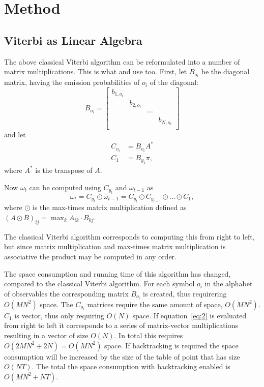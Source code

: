 \chapter{Method}
\label{cha:method}

\section{Viterbi as Linear Algebra}
\label{sec:algorithm-as-linear}

The above classical Viterbi algorithm can be reformulated into a number of
matrix multiplications. This is what \citet{sand2013ziphmmlib} and
\citet{lifshits2009speeding} use too. First, let $B_{o_i}$ be the diagonal
matrix, having the emission probabilities of $o_i$ of the diagonal:
\begin{equation*}
  B_{o_i} =
  \begin{bmatrix}
    b_{1, o_i} &            &        &            \\
               & b_{2, o_i} &        &            \\
               &            & \cdots &            \\
               &            &        & b_{N, o_i} \\
  \end{bmatrix}
\end{equation*}
and let
\begin{align*}
  C_{o_i} &= B_{o_i} A^* \\
  C_1 &= B_{y_1} \pi,
\end{align*}
where $A^*$ is the transpose of $A$.

Now $\omega_t$ can be computed using $C_{y_t}$ and $\omega_{t - 1}$ as
\begin{equation}
  \label{eq:2}
  \omega_t = C_{y_t} \odot \omega_{t - 1} = C_{y_t} \odot C_{y_{t-1}} \odot
  \dots \odot C_1,
\end{equation}
where $\odot$ is the max-times matrix multiplication defined as ${(A \odot
  B)}_{ij} = \max_k A_{ik} \cdot B_{kj}$.

The classical Viterbi algorithm corresponds to computing this from right to
left, but since matrix multiplication and max-times matrix multiplication is
associative the product may be computed in any order.


The space consumption and running time of this algorithm has changed, compared
to the classical Viterbi algorithm. For each symbol $o_i$ in the alphabet of
observables the corresponding matrix $B_{o_i}$ is created, thus requirering
$O(M N^2)$ space. The $C_{o_i}$ matrices require the same amount of space,
$O(M N^2)$. $C_1$ is vector, thus only requiring $O(N)$ space. If
equation~\eqref{eq:2} is evaluated from right to left it corresponds to a
series of matrix-vector multiplications resulting in a vector of size
$O(N)$. In total this requires $O(2 M N^2 + 2 N) = O(M N^2)$ space. If
backtracking is required the space consumption will be increased by the size of
the table of point that has size $O(N T)$. The total the space consumption with
backtracking enabled is $O(M N^2 + N T)$.

